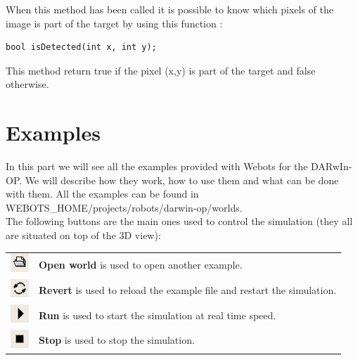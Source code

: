 \documentclass[a4paper, 12pt]{article}  		%
\begin{document}
When this method has been called it is possible to know which pixels of the image is part of the target by using this function :\\

\lstset{language=c++} 
\lstset{commentstyle=\textit} 
\begin{lstlisting} 
bool isDetected(int x, int y);
\end{lstlisting}

This method return true if the pixel (x,y) is part of the target and false otherwise.\\



\newpage
\section{Examples}

In this part we will see all the examples provided with Webots for the DARwIn-OP. We will describe how they work, how to use them and what can be done with them. All the examples can be found in WEBOTS\_HOME/projects/robots/darwin-op/worlds.\\

The following buttons are the main ones used to control the simulation (they all are situated on top of the 3D view):
\begin{table}[H]
\begin{center}
\begin{tabular}{ c l }
\includegraphics{button_open.png} & \textbf{Open world} is used to open another example. \\
\includegraphics{button_revert.png} & \textbf{Revert} is used to reload the example file and restart the simulation. \\
\includegraphics{button_play.png} & \textbf{Run} is used to start the simulation at real time speed. \\
\includegraphics{button_stop.png} & \textbf{Stop} is used to stop the simulation. \\
\end{tabular}
\end{center}
\end{table}
\end{document}
